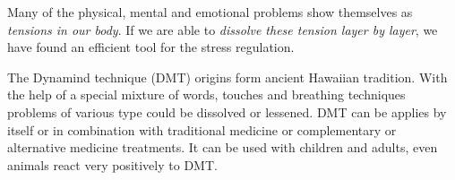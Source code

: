 \documentclass[../main.tex]{subfiles}
\begin{document}
\label{Ex:Dynamind}
Many of the physical, mental and emotional problems show themselves as \emph{tensions in our body}.
If we are able to \emph{dissolve these tension layer by layer}, we have found an efficient tool for the stress regulation.

The Dynamind technique (DMT) origins form ancient Hawaiian tradition.
With the help of a special mixture of words, touches and breathing techniques
problems of various type could be dissolved or lessened.
DMT can be applies by itself or in combination with traditional medicine or complementary or alternative medicine treatments.
It can be used with children and adults, even animals react very positively to DMT.
\end{document}
